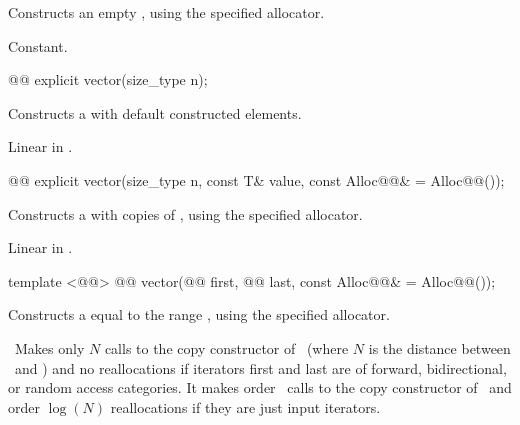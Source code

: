 \documentclass[american,twoside]{book}
\begin{document}
\begin{itemdescr}
\pnum
\effects Constructs an empty , using the
specified allocator.

\pnum
\complexity Constant.
\end{itemdescr}

\begin{itemdecl}
@@ explicit vector(size_type n);
\end{itemdecl}

\begin{itemdescr}
\pnum
\effects Constructs a  with 
default constructed elements.

\pnum
{}

\pnum
\complexity Linear in .
\end{itemdescr}

\begin{itemdecl}
@@
explicit vector(size_type n, const T& value,
                const Alloc@@& = Alloc@@());
\end{itemdecl}

\begin{itemdescr}
\pnum
\effects Constructs a  with 
copies of , using the specified allocator.

\pnum
{}

\pnum
\complexity Linear in .
\end{itemdescr}

\begin{itemdecl}
template <@@>
  @@
  vector(@@ first, @@ last,
         const Alloc@@& = Alloc@@());
\end{itemdecl}

\begin{itemdescr}

\pnum
\effects Constructs a  equal to the
range , using the specified allocator.

\pnum
\complexity\ 
Makes only $N$
calls to the copy constructor of
\
(where $N$
is the distance between
\
and
)
and no reallocations if iterators first and last are of forward, bidirectional, or random access categories.
It makes order
\tcode{N}\
calls to the copy constructor of
\tcode{T}\
and order
$\log(N)$
reallocations if they are just input iterators.
\end{itemdescr}
\end{document}
